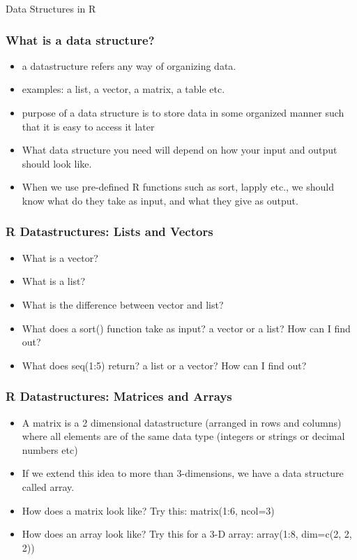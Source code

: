 \documentclass{beamer}
\begin{document}
\begin{frame}
\Large Data Structures in R
\end{frame}

\begin{frame}
\frametitle{What is a data structure?}
\begin{itemize}
\item a datastructure refers any way of organizing data.
\item examples: a list, a vector, a matrix, a table etc.
\item purpose of a data structure is to store data in some organized manner such that it is easy to access it later 
\item What data structure you need will depend on how your input and output should look like.
\item When we use pre-defined R functions such as sort, lapply etc., we should know what do they take as input, and what they give as output. 
\end{itemize}
\end{frame}

\begin{frame}
\frametitle{R Datastructures: Lists and Vectors}
\begin{itemize}
\item What is a vector?
\item What is a list?
\item What is the difference between vector and list? \pause
\item What does a sort() function take as input? a vector or a list? How can I find out? \pause
\item What does seq(1:5) return? a list or a vector? How can I find out? 
\end{itemize}
\end{frame}

\begin{frame}[fragile]
\frametitle{R Datastructures: Matrices and Arrays}
\begin{itemize}
\item A matrix is a 2 dimensional datastructure (arranged in rows and columns) where all elements are of the same data type (integers or strings or decimal numbers etc)
\item If we extend this idea to more than 3-dimensions, we have a data structure called array.
\item How does a matrix look like? Try this:  matrix(1:6, ncol=3)
\item How does an array look like? Try this for a 3-D array: array(1:8, dim=c(2, 2, 2))
\end{itemize}
\end{frame}
\end{document}
